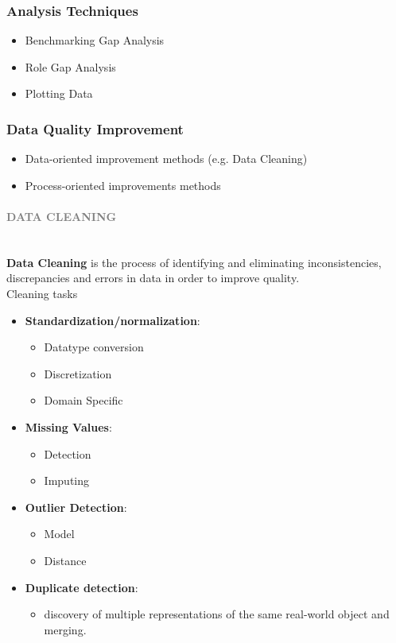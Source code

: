 \documentclass[10pt,a4paper]{article}
\newcommand{\myparagraph}[1]{\paragraph{\normalsize{\textcolor{gray}{\uppercase{\textbf{#1}}}} }\mbox{} \vspace{0.5em}\\}
\begin{document}
\subsubsection{Analysis Techniques}
\begin{itemize}
	\item Benchmarking Gap Analysis
	\item Role Gap Analysis
	\item Plotting Data
\end{itemize}
\subsubsection{Data Quality Improvement}
\begin{itemize}
	\item Data-oriented improvement methods (e.g. Data Cleaning)
	\item Process-oriented improvements methods
\end{itemize}
\myparagraph{Data Cleaning}
\textbf{Data Cleaning} is the process of identifying and eliminating inconsistencies, discrepancies and errors in data in order to improve quality. \\
Cleaning tasks
\begin{itemize}
	\item \textbf{Standardization/normalization}:
	\begin{itemize}
		\item Datatype conversion
		\item Discretization
		\item Domain Specific
	\end{itemize}
	\item \textbf{Missing Values}:
	\begin{itemize}
		\item Detection
		\item Imputing
	\end{itemize}
	\item \textbf{Outlier Detection}:
	\begin{itemize}
		\item Model
		\item Distance
	\end{itemize}
	\item \textbf{Duplicate detection}:
	\begin{itemize}
		\item discovery of multiple representations of the same real-world object and merging.
	\end{itemize}	
\end{itemize}
\end{document}
